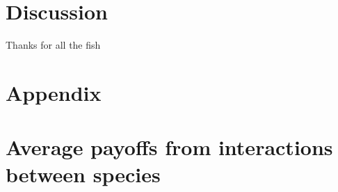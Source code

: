 \documentclass{pnastwo}
\begin{document}
\begin{article}
\section{Discussion}




\begin{acknowledgments}
Thanks for all the fish
\end{acknowledgments}




\appendix

\section*{Appendix}

\section*{Average payoffs from interactions between species}
\label{appA}


\end{article}
\end{document}
